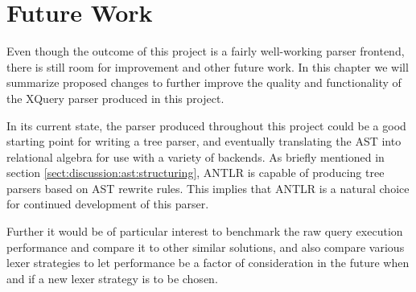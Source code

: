 \chapter{Future Work}
\label{sect:summary:future_work}
\label{chapter:future}
\label{sect:future:improvements}

Even though the outcome of this project is a fairly well-working parser
frontend, there is still room for improvement and other future work. In this
chapter we will summarize proposed changes to further improve the quality and
functionality of the XQuery parser produced in this project.

In its current state, the parser produced throughout this project could be a good
starting point for writing a tree parser, and eventually translating the AST
into relational algebra for use with a variety of backends. As briefly
mentioned in section \ref{sect:discussion:ast:structuring}, ANTLR is capable of
producing tree parsers based on AST rewrite rules. This implies that ANTLR is a
natural choice for continued development of this parser.

Further it would be of particular interest to benchmark the raw query execution
performance and compare it to other similar solutions, and also compare various
lexer strategies to let performance be a factor of consideration in the future
when and if a new lexer strategy is to be chosen.

